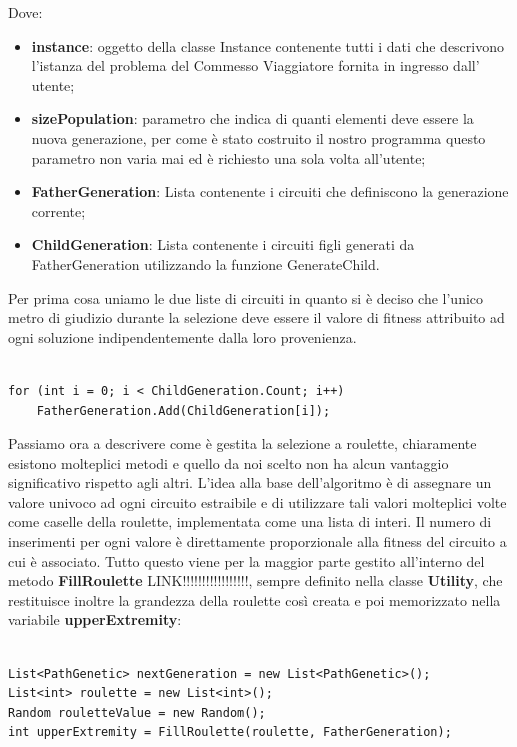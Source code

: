\documentclass[11pt]{article}
\begin{document}
Dove:

\begin{itemize}
    
    \item \textbf{instance}: oggetto della classe Instance contenente tutti i dati che descrivono l'istanza del problema del Commesso Viaggiatore fornita in ingresso dall' utente;
    \item \textbf{sizePopulation}: parametro che indica di quanti elementi deve essere la nuova generazione, per come è stato costruito il nostro programma questo parametro non varia mai ed è richiesto una sola volta all'utente;
    \item \textbf{FatherGeneration}: Lista contenente i circuiti che definiscono la generazione corrente;
    \item \textbf{ChildGeneration}: Lista contenente i circuiti figli generati da FatherGeneration utilizzando la funzione GenerateChild.

\end{itemize}

Per prima cosa uniamo le due liste di circuiti in quanto si è deciso che l'unico metro di giudizio durante la selezione deve essere il valore di fitness attribuito ad ogni soluzione indipendentemente dalla loro provenienza.

\begin{lstlisting}

for (int i = 0; i < ChildGeneration.Count; i++)
    FatherGeneration.Add(ChildGeneration[i]);

\end{lstlisting}

Passiamo ora a descrivere come è gestita la selezione a roulette, chiaramente esistono molteplici metodi e quello da noi scelto non ha alcun vantaggio significativo rispetto agli altri. L'idea alla base dell'algoritmo è di assegnare un valore univoco ad ogni circuito estraibile e di utilizzare tali valori molteplici volte come caselle della roulette, implementata come una lista di interi. Il numero di inserimenti per ogni valore è direttamente proporzionale alla fitness del circuito a cui è associato. Tutto questo viene per la maggior parte gestito all'interno del metodo \textbf{FillRoulette} LINK!!!!!!!!!!!!!!!!!, sempre definito nella classe \textbf{Utility}, che restituisce inoltre la grandezza della roulette così creata e poi memorizzato nella variabile \textbf{upperExtremity}:

\begin{lstlisting}

List<PathGenetic> nextGeneration = new List<PathGenetic>();
List<int> roulette = new List<int>();
Random rouletteValue = new Random();
int upperExtremity = FillRoulette(roulette, FatherGeneration);

\end{lstlisting}
\end{document}
